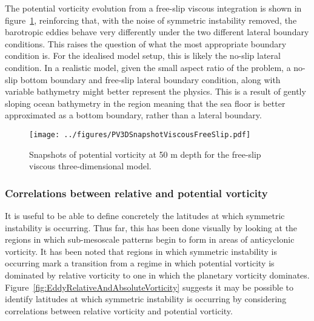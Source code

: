 The potential vorticity evolution from a free-slip viscous integration is shown in figure~\ref{fig:PV3DSnapshotViscousFreeSlip}, reinforcing that, with the noise of symmetric instability removed, the barotropic eddies behave very differently under the two different lateral boundary conditions. This raises the question of what the most appropriate boundary condition is. For the idealised model setup, this is likely the no-slip lateral condition. In a realistic model, given the small aspect ratio of the problem, a no-slip bottom boundary and free-slip lateral boundary condition, along with variable bathymetry might better represent the physics. This is a result of gently sloping ocean bathymetry in the region meaning that the sea floor is better approximated as a bottom boundary, rather than a lateral boundary.

\begin{figure} 
    \centering
    \texttt{[image: ../figures/PV3DSnapshotViscousFreeSlip.pdf]}
    \caption{Snapshots of potential vorticity at 50 m depth for the free-slip viscous three-dimensional model.}
    \label{fig:PV3DSnapshotViscousFreeSlip}
\end{figure}

\subsubsection{Correlations between relative and potential vorticity}
It is useful to be able to define concretely the latitudes at which symmetric instability is occurring. Thus far, this has been done visually by looking at the regions in which sub-mesoscale patterns begin to form in areas of anticyclonic vorticity. It has been noted that regions in which symmetric instability is occurring mark a transition from a regime in which potential vorticity is dominated by relative vorticity to one in which the planetary vorticity dominates. Figure~\ref{fig:EddyRelativeAndAbsoluteVorticity} suggests it may be possible to identify latitudes at which symmetric instability is occurring by considering correlations between relative vorticity and potential vorticity.

